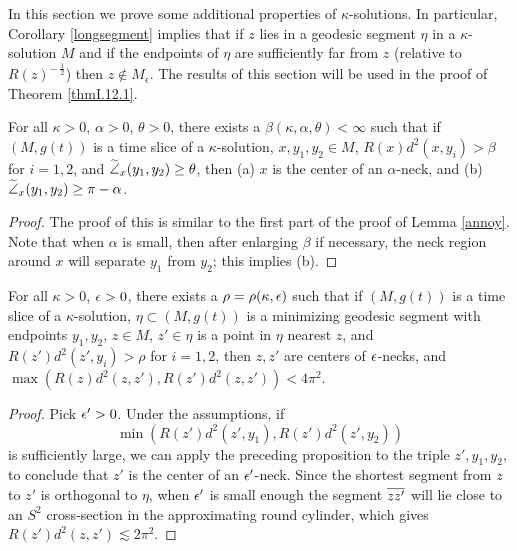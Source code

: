 In  this section we prove some additional properties of
$\kappa$-solutions. In particular, Corollary \ref{longsegment} implies
that if
$z$
lies in a geodesic segment $\eta$ in a $\kappa$-solution $M$
and if the endpoints of $\eta$ are sufficiently far from
$z$ (relative to $R(z)^{- \: \frac12}$) then $z \notin M_\epsilon$.
The results of this section will be used in the proof of Theorem
\ref{thmI.12.1}.

\begin{proposition}
  \label{prop:kl-more-properties-solutions-existence-kappa-solutions}

\label{neckcrit}
For all $\kappa>0$, $\alpha>0$, $\theta>0$,
there exists a $\beta(\kappa,\alpha,\theta)<\infty$
such that if $(M,g(t))$ is a time slice of a $\kappa$-solution,
$x,y_1,y_2\in M$, $R(x)d^2(x,y_i)>\beta$ for $i=1,2$, and $\widetilde{\angle}_x(y_1,y_2)\geq \theta$,
then (a) $x$ is the center of
 an $\alpha$-neck, and (b) $\widetilde{\angle}_x(y_1,y_2)\geq \pi-
\alpha$.
\end{proposition}
\begin{proof}
The proof of this is similar to the first part of the proof of
Lemma \ref{annoy}.  Note that when $\alpha$ is small, then after enlarging
$\beta$ if necessary, the neck region around $x$ will separate
$y_1$ from $y_2$; this implies (b).
\end{proof}

\begin{corollary}
  \label{cor:kl-more-properties-solutions-existence-kappa-solutions}
 \label{longsegment}
For all $\kappa>0$, $\epsilon>0$, there exists a $\rho=\rho(\kappa,\epsilon)$ such that
if $(M,g(t))$ is a time slice of a $\kappa$-solution, $\eta\subset (M,g(t))$
is a minimizing geodesic segment with endpoints $y_1,y_2$, $z\in M$, $z'\in \eta$
is a point in $\eta$ nearest $z$, and $R(z')d^2(z',y_i)>\rho$
for $i=1,2$, then
$z,z'$ are centers of
$\epsilon$-necks, and $\max(R(z)d^2(z,z'),R(z')d^2(z,z'))<4\pi^2$.
\end{corollary}
\begin{proof}
Pick $\epsilon'>0$.  Under the assumptions, if
\begin{equation}
\min(R(z')d^2(z',y_1),R(z')d^2(z',y_2))
\end{equation}
is sufficiently large, we can apply the preceding proposition
to the triple $z',y_1,y_2$, to conclude that $z'$ is the center of an
$\epsilon'$-neck.  Since the shortest segment from $z$ to $z'$
is orthogonal to $\eta$, when $\epsilon'$ is small enough
the segment $\overline{zz'}$ will lie close to an $S^2$ cross-section
in the approximating round cylinder, which
gives $R(z')d^2(z,z')\lesssim 2\pi^2$.
\end{proof}

